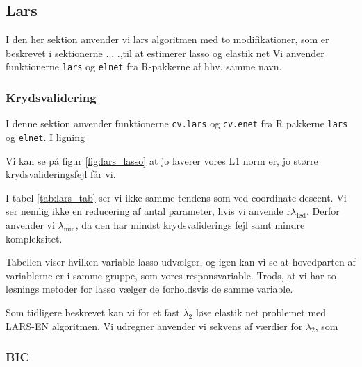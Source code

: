 \subsection{Lars}
I den her sektion anvender vi lars algoritmen med to modifikationer, som er beskrevet i sektionerne ... .,til at estimerer lasso og elastik net
Vi anvender funktionerne \texttt{lars} og \texttt{elnet} fra R-pakkerne af hhv. samme navn.

\subsubsection{Krydsvalidering}
I denne sektion anvender funktionerne  \texttt{cv.lars} og \texttt{cv.enet} fra R pakkerne \texttt{lars} og \texttt{elnet}. 
I ligning 

Vi kan se på figur \ref{fig:lars_lasso} at jo laverer vores L1 norm er, jo større krydsvalideringsfejl får vi.  


I tabel \ref{tab:lars_tab} ser vi ikke samme tendens som ved coordinate descent. 
Vi ser nemlig ikke en reducering af antal parameter, hvis vi anvende r$\lambda_{1\text{sd}}$.
Derfor anvender vi $\lambda_{\min}$, da den har mindst krydsvaliderings fejl samt mindre kompleksitet. 





Tabellen viser hvilken variable lasso udvælger, og igen kan vi se at hovedparten af variablerne er i samme gruppe, som vores responsvariable. 
Trods, at vi har to løsnings metoder for lasso vælger de forholdsvis de samme variable.



Som tidligere beskrevet kan vi for et fast $\lambda_2$ løse elastik net problemet med LARS-EN algoritmen. 
Vi udregner
anvender vi sekvens af værdier for $\lambda_2$, som 

\subsubsection{BIC}